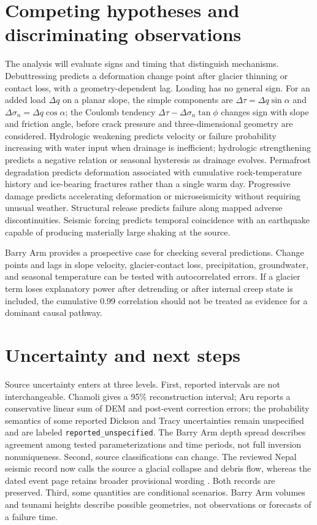 \documentclass[11pt]{article}
\begin{document}
\section{Competing hypotheses and discriminating observations}

The analysis will evaluate signs and timing that distinguish mechanisms.
Debuttressing predicts a deformation change point after glacier thinning or
contact loss, with a geometry-dependent lag. Loading has no general sign. For
an added load $\Delta q$ on a planar slope, the simple components are
$\Delta\tau=\Delta q\sin\alpha$ and
$\Delta\sigma_n=\Delta q\cos\alpha$; the Coulomb tendency
$\Delta\tau-\Delta\sigma_n\tan\phi$ changes sign with slope and friction
angle, before crack pressure and three-dimensional geometry are considered.
Hydrologic weakening predicts velocity or
failure probability increasing with water input when drainage is inefficient;
hydrologic strengthening predicts a negative relation or seasonal hysteresis
as drainage evolves. Permafrost degradation predicts deformation associated
with cumulative rock-temperature history and ice-bearing fractures rather
than a single warm day. Progressive damage predicts accelerating deformation
or microseismicity without requiring unusual weather. Structural release
predicts failure along mapped adverse discontinuities. Seismic forcing
predicts temporal coincidence with an earthquake capable of producing
materially large shaking at the source.

Barry Arm provides a prospective case for checking several predictions. Change points
and lags in slope velocity, glacier-contact loss, precipitation, groundwater,
and seasonal temperature can be tested with autocorrelated errors. If a
glacier term loses explanatory power after detrending or after internal creep
state is included, the cumulative 0.99 correlation should not be treated as
evidence for a dominant causal pathway.

\section{Uncertainty and next steps}

Source uncertainty enters at three levels. First, reported intervals are not
interchangeable. Chamoli gives a 95\% reconstruction interval; Aru reports a
conservative linear sum of DEM and post-event correction errors; the
probability semantics of some reported Dickson and Tracy uncertainties remain
unspecified and are labeled \texttt{reported\_unspecified}. The Barry Arm depth spread describes agreement
among tested parameterizations and time periods, not full inversion
nonuniqueness. Second, source classifications can change. The
reviewed Nepal seismic record now calls the source a glacial collapse and
debris flow, whereas the dated event page retains broader provisional wording
\citep{USGS2026Nepal,USGS2026NepalSeismic}. Both records are preserved. Third,
some quantities are conditional scenarios. Barry Arm volumes and tsunami
heights describe possible geometries, not observations or forecasts of a
failure time.
\end{document}
